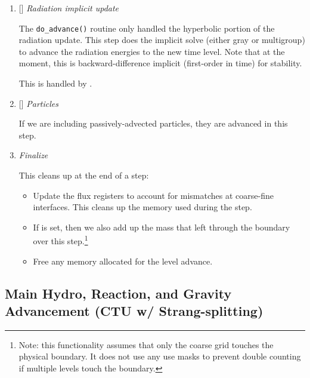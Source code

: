 \begin{enumerate}
\item {[]} {\em Radiation implicit update} 

  The {\tt do\_advance()} routine only handled the hyperbolic
  portion of the radiation update.  This step does the implicit solve
  (either gray or multigroup) to advance the radiation energies to the 
  new time level.  Note that at the moment, this is backward-difference
  implicit (first-order in time) for stability.

  This is handled by .

\item {[]} {\em Particles} 

  If we are including passively-advected particles, they are
  advanced in this step.

\item {\em Finalize}

  This cleans up at the end of a step:
  \begin{itemize}
    \item Update the flux registers to account for mismatches at
      coarse-fine interfaces.  This cleans up the memory used during
      the step.

    \item If  is set, then we
      also add up the mass that left through the boundary over this
      step.\footnote{Note: this functionality assumes that only the
        coarse grid touches the physical boundary.  It does not use
        any use masks to prevent double counting if multiple levels
        touch the boundary.}

    \item Free any memory allocated for the level advance.
  \end{itemize}

\end{enumerate}

\subsection{Main Hydro, Reaction, and Gravity Advancement (CTU w/ Strang-splitting)}

